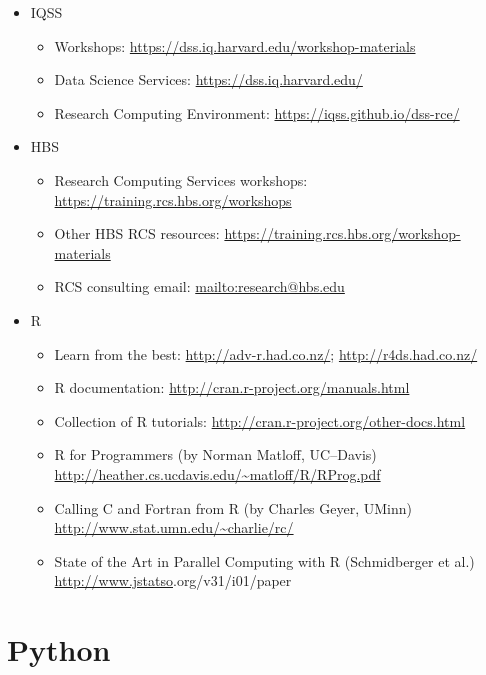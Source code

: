 \documentclass[]{book}
\providecommand{\tightlist}{%
  \setlength{\itemsep}{0pt}\setlength{\parskip}{0pt}}
\begin{document}
\begin{itemize}
\tightlist
\item
  IQSS

  \begin{itemize}
  \tightlist
  \item
    Workshops: \url{https://dss.iq.harvard.edu/workshop-materials}
  \item
    Data Science Services: \url{https://dss.iq.harvard.edu/}
  \item
    Research Computing Environment:
    \url{https://iqss.github.io/dss-rce/}
  \end{itemize}
\item
  HBS

  \begin{itemize}
  \tightlist
  \item
    Research Computing Services workshops:
    \url{https://training.rcs.hbs.org/workshops}
  \item
    Other HBS RCS resources:
    \url{https://training.rcs.hbs.org/workshop-materials}
  \item
    RCS consulting email: \url{mailto:research@hbs.edu}
  \end{itemize}
\item
  R

  \begin{itemize}
  \tightlist
  \item
    Learn from the best: \url{http://adv-r.had.co.nz/};
    \url{http://r4ds.had.co.nz/}
  \item
    R documentation: \url{http://cran.r-project.org/manuals.html}
  \item
    Collection of R tutorials:
    \url{http://cran.r-project.org/other-docs.html}
  \item
    R for Programmers (by Norman Matloff, UC--Davis)
    \url{http://heather.cs.ucdavis.edu/~matloff/R/RProg.pdf}
  \item
    Calling C and Fortran from R (by Charles Geyer, UMinn)
    \url{http://www.stat.umn.edu/~charlie/rc/}
  \item
    State of the Art in Parallel Computing with R (Schmidberger et al.)
    \url{http://www.jstatso}\textbar{}.org/v31/i01/paper
  \end{itemize}
\end{itemize}

\part{Python}\label{part-python}
\end{document}
